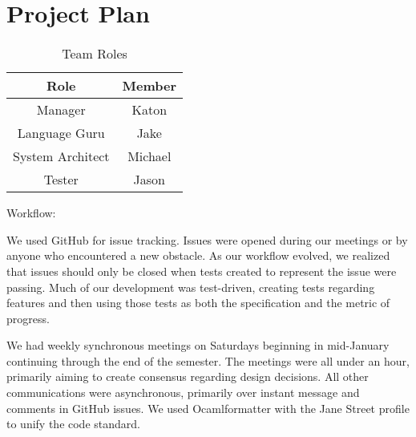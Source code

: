 \section{Project Plan}

\begin{table}[]
	\caption{Team Roles}
    \centering
    \begin{tabular}{|c|c|}
    	\hline
         Role & Member \\\hline
         Manager & Katon \\
         Language Guru & Jake \\
         System Architect & Michael\\
         Tester & Jason\\\hline
    \end{tabular}
\end{table}

Workflow:

We used GitHub for issue tracking. Issues were opened during our meetings or by anyone who encountered a new obstacle. As our workflow evolved, we realized that issues should only be closed when tests created to represent the issue were passing. Much of our development was test-driven, creating tests regarding features and then using those tests as both the specification and the metric of progress.

We had weekly synchronous meetings on Saturdays beginning in mid-January continuing through the end of the semester. The meetings were all under an hour, primarily aiming to create consensus regarding design decisions. All other communications were asynchronous, primarily over instant message and comments in GitHub issues.
We used Ocamlformatter with the Jane Street profile to unify the code standard.



